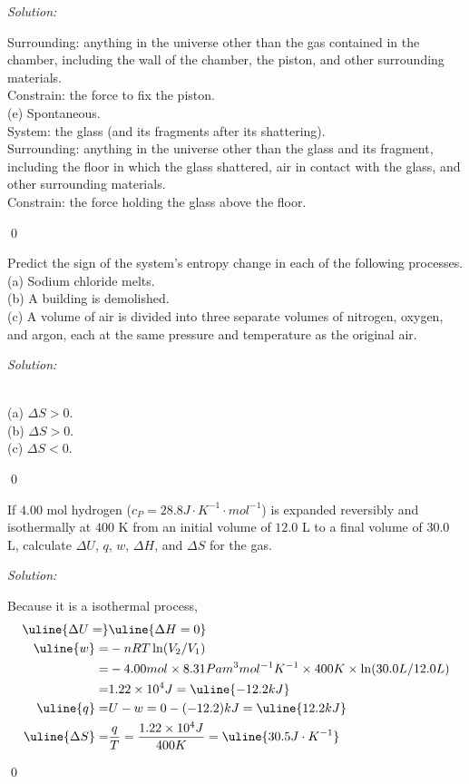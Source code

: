 \documentclass[12pt]{article}
\newenvironment{problem}[2][Problem]{\begin{trivlist}
\item[\hskip \labelsep {\bfseries #1}\hskip \labelsep {\bfseries #2.}]}{\end{trivlist}}
\newenvironment{sol}
    {\emph{Solution:}
    }
    {
    \qed
    }
\begin{document}
\begin{sol}
Surrounding: anything in the universe other than the gas contained in the chamber, including the wall of the chamber, the piston, and other surrounding materials.\\
Constrain: the force to fix the piston.\\
(e) Spontaneous.\\
System: the glass (and its fragments after its shattering).\\
Surrounding: anything in the universe other than the glass and its fragment, including the floor in which the glass shattered, air in contact with the glass, and other surrounding materials.\\
Constrain: the force holding the glass above the floor.
\end{sol}

\begin{problem}{13.9}
Predict the sign of the system's entropy change in each of the following processes.\\
(a) Sodium chloride melts.\\
(b) A building is demolished.\\
(c) A volume of air is divided into three separate volumes of nitrogen, oxygen, and argon, each at the same pressure and temperature as the original air.
\end{problem}
\begin{sol}
\\(a) \uline{$\Delta S>0$}.\\
(b) \uline{$\Delta S>0$}.\\
(c) \uline{$\Delta S<0$}.
\end{sol}

\begin{problem}{13.15}
If $4.00$ mol hydrogen ($c_P=28.8J\cdot K^{-1}\cdot mol^{-1}$) is expanded reversibly and isothermally at $400$ K from an initial volume of $12.0$ L to a final volume of $30.0$ L, calculate $\Delta U$, $q$, $w$, $\Delta H$, and $\Delta S$ for the gas.
\end{problem}
\begin{sol}
Because it is a isothermal process,
\begin{align*}
\uline{\Delta U=}&\uline{\Delta H=0}\\
\uline{w}=&-nRT\ln(V_2/V_1)\\
=&-4.00mol\times8.31Pa m^3mol^{-1}K^{-1}\times400K\times\ln(30.0L/12.0L)\\
=&1.22\times10^4J=\uline{-12.2kJ}\\
\uline{q}=&U-w=0-(-12.2)kJ=\uline{12.2kJ}\\
\uline{\Delta S}=&\frac{q}{T}=\frac{1.22\times10^4J}{400K}=\uline{30.5J\cdot K^{-1}}
\end{align*}
\end{sol}
\end{document}

